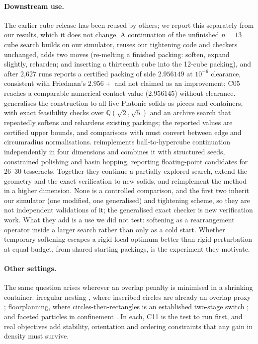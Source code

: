 \paragraph{Downstream use.} The earlier cube release \citep{softtorigidpacking} has been reused by others; we report this separately from our results, which it does not change. A continuation of the unfinished $n=13$ cube search \citep{n13repo} builds on our simulator, reuses our tightening code and checkers unchanged, adds two moves (re-melting a finished packing: soften, expand slightly, reharden; and inserting a thirteenth cube into the 12-cube packing), and after 2{,}627 runs reports a certified packing of side $2.956149$ at $10^{-6}$ clearance, consistent with Friedman's $2.956+$ and not claimed as an improvement; C05 reaches a comparable numerical contact value ($2.956145$) without clearance. \citet{platonicrepo} generalises the construction to all five Platonic solids as pieces and containers, with exact feasibility checks over $\mathbb{Q}(\sqrt2,\sqrt5)$ and an archive search that repeatedly softens and rehardens existing packings; the reported values are certified upper bounds, and comparisons with \citet{Berthold2026} must convert between edge and circumradius normalisations. \citet{tesseractrepo} reimplements ball-to-hypercube continuation independently in four dimensions and combines it with structured seeds, constrained polishing and basin hopping, reporting floating-point candidates for 26--30 tesseracts. Together they continue a partially explored search, extend the geometry and the exact verification to new solids, and reimplement the method in a higher dimension. None is a controlled comparison, and the first two inherit our simulator (one modified, one generalised) and tightening scheme, so they are not independent validations of it; the generalised exact checker is new verification work. What they add is a use we did not test: softening as a rearrangement operator inside a larger search rather than only as a cold start. Whether temporary softening escapes a rigid local optimum better than rigid perturbation at equal budget, from shared starting packings, is the experiment they motivate.

\paragraph{Other settings.} The same question arises wherever an overlap penalty is minimised in a shrinking container: irregular nesting \citep{Wascher2007,Bennell2008,Leao2020}, where inscribed circles are already an overlap proxy \citep{Jones2014,Gardeyn2025}; floorplanning, where circles-then-rectangles is an established two-stage switch \citep{AnjosVannelli2002,Luo2008}; and faceted particles in confinement \citep{Torquato2018,Wang2018}. In each, C11 is the test to run first, and real objectives add stability, orientation and ordering constraints \citep{Bortfeldt2013,Araujo2019} that any gain in density must survive.
